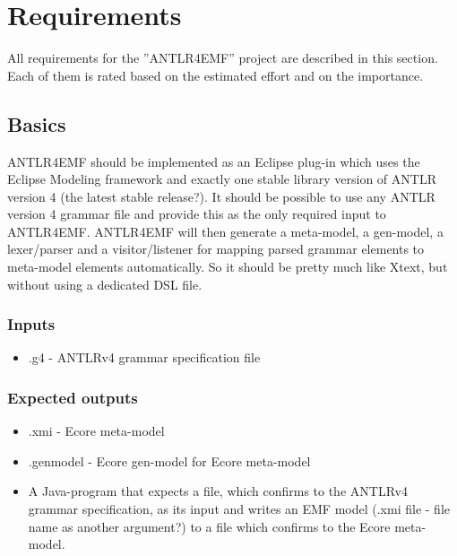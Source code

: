 \section{Requirements}
All requirements for the ''ANTLR4EMF'' project
are described in this section.
Each of them is rated based on the estimated effort
and on the importance.

\subsection{Basics}
ANTLR4EMF should be implemented as an Eclipse plug-in
which uses the Eclipse Modeling framework and 
exactly one stable library version of ANTLR version 4
(the latest stable release?).
It should be possible to use any ANTLR version 4
grammar file and provide this as the only 
required input to ANTLR4EMF. 
ANTLR4EMF will then generate a meta-model,
a gen-model, a lexer/parser and a 
visitor/listener for mapping parsed
grammar elements to meta-model elements
automatically.
So it should be pretty much like Xtext,
but without using a dedicated DSL file.
\subsubsection{Inputs}
\begin{itemize}
	\item .g4 - ANTLRv4 grammar specification file
\end{itemize}
\subsubsection{Expected outputs}
\begin{itemize}
	\item .xmi - Ecore meta-model
	\item .genmodel - Ecore gen-model for Ecore meta-model
	\item A Java-program that expects a file, which confirms to the
	ANTLRv4 grammar specification, as its input and writes an
	EMF model (.xmi file - file name as another argument?)
	to a file which confirms to the Ecore meta-model.
\end{itemize}
